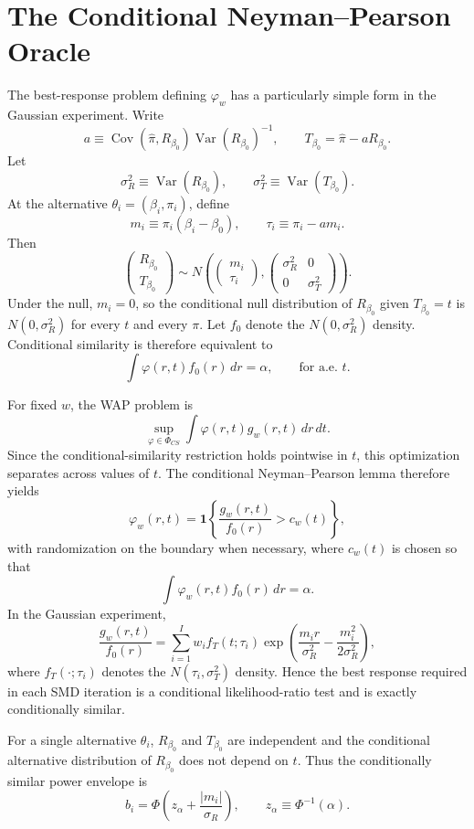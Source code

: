 \documentclass{article}
\theoremstyle{definition}
\theoremstyle{plain}
\theoremstyle{remark}
\begin{document}
\section{The Conditional Neyman--Pearson Oracle}

The best-response problem defining \(\varphi_w\) has a particularly simple form in the Gaussian experiment. Write
\[a\equiv\operatorname{Cov}(\hat{\pi},R_{\beta_0})\operatorname{Var}(R_{\beta_0})^{-1},\qquad T_{\beta_0}=\hat{\pi}-aR_{\beta_0}.\]
Let
\[\sigma_R^2\equiv\operatorname{Var}(R_{\beta_0}),\qquad \sigma_T^2\equiv\operatorname{Var}(T_{\beta_0}).\]
At the alternative \(\theta_i=(\beta_i,\pi_i)\), define
\[m_i\equiv\pi_i(\beta_i-\beta_0),\qquad \tau_i\equiv\pi_i-am_i.\]
Then
\[\begin{pmatrix}R_{\beta_0}\\T_{\beta_0}\end{pmatrix}\sim N\left(\begin{pmatrix}m_i\\\tau_i\end{pmatrix},\begin{pmatrix}\sigma_R^2&0\\0&\sigma_T^2\end{pmatrix}\right).\]
Under the null, \(m_i=0\), so the conditional null distribution of \(R_{\beta_0}\) given \(T_{\beta_0}=t\) is \(N(0,\sigma_R^2)\) for every \(t\) and every \(\pi\). Let \(f_0\) denote the \(N(0,\sigma_R^2)\) density. Conditional similarity is therefore equivalent to
\[\int\varphi(r,t)f_0(r)\,dr=\alpha,\qquad \text{for a.e. }t.\]

For fixed \(w\), the WAP problem is
\[\sup_{\varphi\in\Phi_{CS}}\int\varphi(r,t)g_w(r,t)\,dr\,dt.\]
Since the conditional-similarity restriction holds pointwise in \(t\), this optimization separates across values of \(t\). The conditional Neyman--Pearson lemma therefore yields
\[\varphi_w(r,t)=\mathbf{1}\left\{\frac{g_w(r,t)}{f_0(r)}>c_w(t)\right\},\]
with randomization on the boundary when necessary, where \(c_w(t)\) is chosen so that
\[\int\varphi_w(r,t)f_0(r)\,dr=\alpha.\]
In the Gaussian experiment,
\[\frac{g_w(r,t)}{f_0(r)}=\sum_{i=1}^Iw_i f_T(t;\tau_i)\exp\left(\frac{m_i r}{\sigma_R^2}-\frac{m_i^2}{2\sigma_R^2}\right),\]
where \(f_T(\cdot;\tau_i)\) denotes the \(N(\tau_i,\sigma_T^2)\) density. Hence the best response required in each SMD iteration is a conditional likelihood-ratio test and is exactly conditionally similar.

For a single alternative \(\theta_i\), \(R_{\beta_0}\) and \(T_{\beta_0}\) are independent and the conditional alternative distribution of \(R_{\beta_0}\) does not depend on \(t\). Thus the conditionally similar power envelope is
\[b_i=\Phi\left(z_\alpha+\frac{|m_i|}{\sigma_R}\right),\qquad z_\alpha\equiv\Phi^{-1}(\alpha).\]
\end{document}
